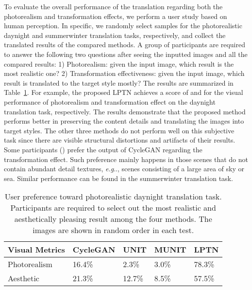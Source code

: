 \documentclass[10pt,twocolumn,letterpaper]{article}
\makeatletter
\DeclareRobustCommand\onedot{\futurelet\@let@token\@onedot}
\def\@onedot{\ifx\@let@token.\else.\null\fi\xspace}
\def\eg{\emph{e.g}\onedot} \def\Eg{\emph{E.g}\onedot}
\makeatother
\begin{document}
	To evaluate the overall performance of the translation regarding both the photorealism and transformation effects, we perform a user study based on human perception. In specific, we randomly select  samples for the photorealistic daynight and summerwinter translation tasks, respectively, and collect the translated results of the compared methods. A group of  participants are required to answer the following two questions after seeing the inputted images and all the compared results: 1) Photorealism: given the input image, which result is the most realistic one? 2) Transformation effectiveness: given the input image, which result is translated to the target style mostly? The results are summarized in Table~\ref{user_study_I2I}. For example, the proposed LPTN achieves a score of  and  for the visual performance of photorealism and transformation effect on the daynight translation task, respectively. The results demonstrate that the proposed method performs better in preserving the content details and translating the images into target styles. The other three methods do not perform well on this subjective task since there are visible structural distortions and artifacts of their results. Some participants () prefer the output of CycleGAN regarding the transformation effect. Such preference mainly happens in those scenes that do not contain abundant detail textures, \eg, scenes consisting of a large area of sky or sea. Similar performance can be found in the summerwinter translation task.
	
	
	\begin{table}[t]
		\caption{User preference toward photorealistic daynight translation task. Participants are required to select out the most realistic and aesthetically pleasing result among the four methods. The images are shown in random order in each test.
		}
		\small
		\vspace{-0.5em}
		\label{user_study_I2I}
		\begin{center}
			\begin{tabular}{p{1.9cm}p{1.3cm}<{\centering}p{0.9cm}<{\centering}p{1cm}<{\centering}p{0.8cm}<{\centering}}
				\toprule
				Visual Metrics&CycleGAN & UNIT & MUNIT & \textbf{LPTN}\\
				\midrule
				Photorealism&16.4\%&2.3\%&3.0\%&78.3\%\\
				Aesthetic&21.3\%&12.7\%&8.5\%&57.5\%\\
				\bottomrule
			\end{tabular}
		\end{center}
	\end{table}
	
\end{document}
